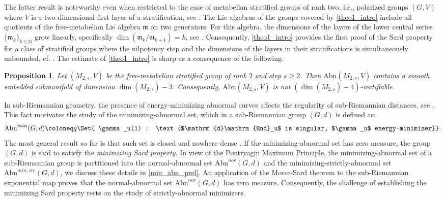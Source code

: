 \documentclass[a4paper,11pt,reqno]{amsart}
\theoremstyle{plain}
\newtheorem{proposition}[theorem]{Proposition}
\theoremstyle{definition}
\newcommand{\de}{\mathrm{d}}
\newcommand{\End}{\mathrm{End}}
\newcommand{\abn}{\mathrm{Abn}}
\begin{document}
The latter result is noteworthy even when restricted to the case of metabelian stratified groups of rank two, i.e., polarized groups $(G,V)$ where $V$ is a two-dimensional first layer of a stratification, see \cite[Section~9.2]{donne2024metricliegroupscarnotcaratheodory}. The Lie algebras of the groups covered by \cref{theo1_intro} include all quotients of the free-metabelian Lie algebra $\mathfrak{m}$ on two generators. For this algebra, the dimensions of the layers of the lower central series $\{\mathfrak{m}_k\}_{k \in \mathbb{N}}$ grow linearly, specifically $\dim(\mathfrak{m}_k/\mathfrak{m}_{k+1})=k$, see \cite[Lemma~3.1]{MR2351997}. Consequently, \cref{theo1_intro} provides the first proof of the Sard property for a class of stratified groups where the nilpotency step and the dimensions of the layers in their stratifications is simultaneously unbounded, cf. \cite{MR4104464,MR4524416}. The estimate of \cref{theo1_intro} is sharp as a consequence of the following.

\begin{proposition}\label{prop:free-metabelian-sharpness}
Let $(M_{2,s},V)$ be the free-metabelian stratified group of rank $2$ and step
$s\geq 2$. Then
$\abn(M_{2,s},V)$ contains a smooth embedded submanifold of
dimension $\dim(M_{2,s})-3$. Consequently, $\abn(M_{2,s},V)$ is not $(\dim(M_{2,s})-4)$-rectifiable.
\end{proposition}

In sub-Riemannian geometry, the presence of energy-minimizing abnormal curves affects the regularity of sub-Riemannian distances, see \cite[Chapter~11]{MR3971262}. This fact motivates the study of the minimizing-abnormal set, which in a sub-Riemannian group $(G,d)$ is defined as:
\begin{equation}
\abn^{min}(G,d) \coloneq q \Set{ \gamma_u(1) : \text{$\de \End_u$ is singular, $\gamma_u$ energy-minimizer}}.
\end{equation}
The most general result so far is that such set is closed and nowhere dense \cite{agrasmoothness,RT-MorseSard}. If the minimizing-abnormal set has zero measure, the group $(G,d)$ is said to satisfy the \emph{minimizing Sard property}. In view of the Pontryagin Maximum Principle, the minimizing-abnormal set of a sub-Riemannian group is partitioned into the normal-abnormal set $\abn^{nor}(G,d)$ and the minimizing-strictly-abnormal set $\abn^{min,str}(G,d)$, we discuss these details in \cref{min_abn_prel}. An application of the Morse-Sard theorem to the sub-Riemannian exponential map proves that the normal-abnormal set $\abn^{nor}(G,d)$ has zero measure. Consequently, the challenge of establishing the minimizing Sard property rests  on the study of strictly-abnormal minimizers. 
\end{document}
